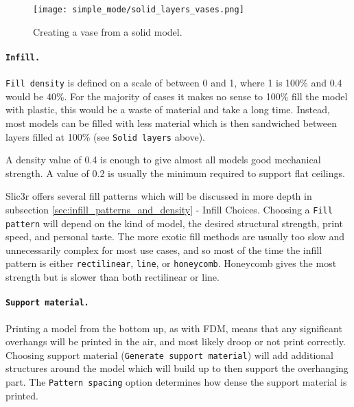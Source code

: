 \begin{figure}[H]
\centering
\texttt{[image: simple\_mode/solid\_layers\_vases.png]}
\caption{Creating a vase from a solid model.}
\label{fig:solid_layers_vases}
\end{figure}


\paragraph{\texttt{Infill.}} %
\label{par:simple_infill}
\texttt{Fill density} is defined on a scale of between 0 and 1, where 1 is 100\% and 0.4 would be 40\%.  For the majority of cases it makes no sense to 100\% fill the model with plastic, this would be a waste of material and take a long time.  Instead, most models can be filled with less material which is then sandwiched between layers filled at 100\% (see \texttt{Solid layers} above).

A density value of 0.4 is enough to give almost all models good mechanical strength.  A value of 0.2 is usually the minimum required to support flat ceilings.

Slic3r offers several fill patterns which will be discussed in more depth in subsection \ref{sec:infill_patterns_and_density} - Infill Choices.  Choosing a \texttt{Fill pattern} will depend on the kind of model, the desired structural  strength, print speed, and personal taste.  The more exotic fill methods are usually too slow and unnecessarily complex for most use cases, and so most of the time the infill pattern is either \texttt{rectilinear}, \texttt{line}, or \texttt{honeycomb}.  Honeycomb gives the most strength but is slower than both rectilinear or line.


\paragraph{\texttt{Support material.}} %
\label{par:simple_support_material}
Printing a model from the bottom up, as with FDM, means that any significant overhangs will be printed in the air, and most likely droop or not print correctly.  Choosing support material (\texttt{Generate support material}) will add additional structures around the model which will build up to then support the overhanging part.  The \texttt{Pattern spacing} option determines how dense the support material is printed.


